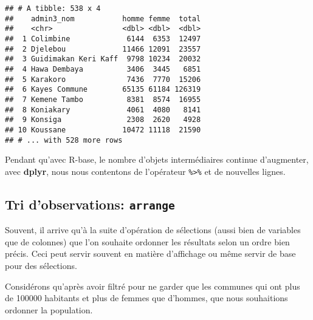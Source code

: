 \documentclass[]{book}
\begin{document}
\begin{verbatim}
## # A tibble: 538 x 4
##    admin3_nom           homme femme  total
##    <chr>                <dbl> <dbl>  <dbl>
##  1 Colimbine             6144  6353  12497
##  2 Djelebou             11466 12091  23557
##  3 Guidimakan Keri Kaff  9798 10234  20032
##  4 Hawa Dembaya          3406  3445   6851
##  5 Karakoro              7436  7770  15206
##  6 Kayes Commune        65135 61184 126319
##  7 Kemene Tambo          8381  8574  16955
##  8 Koniakary             4061  4080   8141
##  9 Konsiga               2308  2620   4928
## 10 Koussane             10472 11118  21590
## # ... with 528 more rows
\end{verbatim}

Pendant qu'avec R-base, le nombre d'objets intermédiaires continue
d'augmenter, avec \textbf{dplyr}, nous nous contentons de l'opérateur
\texttt{\%\textgreater{}\%} et de nouvelles lignes.

\subsection{\texorpdfstring{Tri d'observations:
\texttt{arrange}}{Tri d'observations: arrange}}\label{tri-dobservations-arrange}

Souvent, il arrive qu'à la suite d'opération de sélections (aussi bien
de variables que de colonnes) que l'on souhaite ordonner les résultats
selon un ordre bien précis. Ceci peut servir souvent en matière
d'affichage ou même servir de base pour des sélections.

Considérons qu'après avoir filtré pour ne garder que les communes qui
ont plus de 100000 habitants et plus de femmes que d'hommes, que nous
souhaitions ordonner la population.
\end{document}
